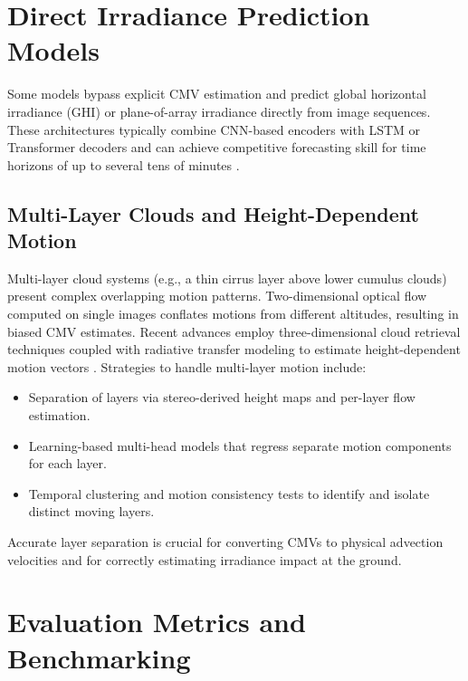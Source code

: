 \section{Direct Irradiance Prediction Models}
Some models bypass explicit CMV estimation and predict global horizontal irradiance (GHI) or plane-of-array irradiance directly from image sequences. These architectures typically combine CNN-based encoders with LSTM or Transformer decoders and can achieve competitive forecasting skill for time horizons of up to several tens of minutes \cite{qin2022cloudcast,nouri2021skycam}.

\subsection{Multi-Layer Clouds and Height-Dependent Motion}

Multi-layer cloud systems (e.g., a thin cirrus layer above lower cumulus clouds) present complex overlapping motion patterns. Two-dimensional optical flow computed on single images conflates motions from different altitudes, resulting in biased CMV estimates. Recent advances employ three-dimensional cloud retrieval techniques coupled with radiative transfer modeling to estimate height-dependent motion vectors \cite{kosmopoulos2024}. Strategies to handle multi-layer motion include:
\begin{itemize}
  \item Separation of layers via stereo-derived height maps and per-layer flow estimation.
  \item Learning-based multi-head models that regress separate motion components for each layer.
  \item Temporal clustering and motion consistency tests to identify and isolate distinct moving layers.
\end{itemize}

Accurate layer separation is crucial for converting CMVs to physical advection velocities and for correctly estimating irradiance impact at the ground.

\section{Evaluation Metrics and Benchmarking}
\label{sec:benchmark}

